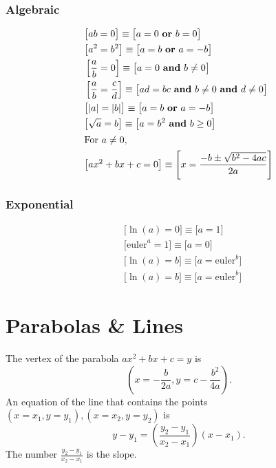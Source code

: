 \documentclass[letterpaper,landscape,9pt,fleqn]{extarticle}
\newcommand{\euler}{\mathrm{euler}}
\begin{document}
\begin{multicols*}{3}
\subsubsection*{Algebraic}
\vspace{-0.2in}
\begin{minipage}[c]{0.3333333333333\textwidth}
\begin{align*}
& \big [a b = 0 \big ] \equiv \big [ a = 0 \mbox{ \textbf{or} } b = 0 \big ]\\
& \big [ a^2 = b^2 \big ] \equiv \big [ a = b \mbox{ \textbf{or} } a = -b \big ]\\
&\left [ \frac{a}{b} = 0 \right ] \equiv \big [ a = 0 \mbox{ \textbf{and} } b \neq 0 \big ] \\
&\left [\frac{a}{b} = \frac{c}{d}  \right ] \equiv \big [ad  = bc \mbox{ \textbf{and}  } b \neq 0  \mbox{ \textbf{and}  }  d \neq 0 \big ] \\
&\big [|a| = |b|  \big ] \equiv \big [a =b \mbox{ \textbf{or} } a = -b \big ]\\
&\big [ \sqrt{a}  = b \big ] \equiv \big [a = b^2 \mbox{ \textbf{and}  } b \ge 0 \big ] \\
\intertext{For \(a \neq 0\),}
& \big [a x^2 + b x + c = 0 \big] \equiv \left [x = \frac{-b \pm \sqrt{b^2 - 4 a c}}{2 a} \right] \\
\end{align*}
\vspace{-0.52in}
\subsubsection*{Exponential}
\vspace{-0.2in}
\begin{align*}
& \big [\ln(a) = 0 \big] \equiv \big [a =  1\big] \\
& \big [\euler^a = 1 \big] \equiv \big [a = 0 \big] \\
& \big [\ln(a) = b \big] \equiv \big [a = \euler^b \big] \\
& \big [\ln(a) = b \big] \equiv \big [a = \euler^b \big] 
\end{align*}
\end{minipage}

\section*{Parabolas \& Lines}
The vertex of the parabola $a x^2 + b x + c = y$ is
\[
   \left(x = -\frac{b}{2 a}, y = c-\frac{{{b}^{2}}}{4 a} \right).
\]
An equation of the line that contains the points
\( (x=x_1, y = y_1), (x=x_2, y = y_2) \) is
\[
  y - y_1 = \left(\frac{y_2-y_1}{x_2-x_1} \right) (x - x_1).
\]
The number \(\frac{y_2-y_1}{x_2-x_1} \) is the slope.


\end{multicols*}
\end{document}
